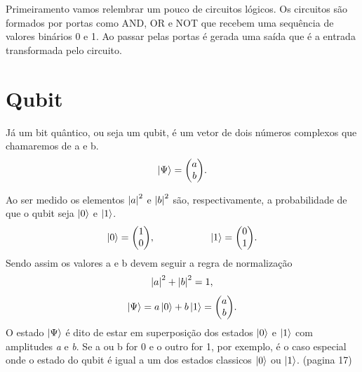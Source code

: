 \documentclass[a4paper, 12pt, oneside]{book}
\begin{document}
Primeiramento vamos relembrar um pouco de circuitos lógicos. Os circuitos são formados por portas como AND, OR e NOT que recebem uma sequência de valores binários 0 e 1. Ao passar pelas portas é gerada uma saída que é a entrada transformada pelo circuito.

\section{Qubit}
Já um bit quântico, ou seja um qubit, é um vetor de dois números complexos que chamaremos de a e b.
\begin{equation} \label{eq1} 
\ket{\Psi} = \mqty(a\\b).
\end{equation}

Ao ser medido os elementos $\abs{a}^2$ e $\abs{b}^2$ são, respectivamente, a probabilidade de que o qubit seja $\ket{0}$ e $\ket{1}$. 
\begin{equation} \label{eq2}
  \ket{0} = \mqty(1\\0) ,\hspace{2cm} 
  \ket{1} = \mqty(0\\1).
\end{equation}
Sendo assim os valores a e b devem seguir a regra de normalização
\begin{equation}\label{eq3}
\abs{a}^2 + \abs{b}^2 = 1,
\end{equation}
\begin{equation}\label{eq4}
\ket{\Psi} = a\ket{0} + b\ket{1} = \mqty(a\\b).
\end{equation}
O estado $\ket{\Psi}$ é dito de estar em superposição dos estados $\ket{0}$ e $\ket{1}$ com amplitudes \textit{a} e \textit{b}. Se a ou b for 0 e o outro for 1, por exemplo, é o caso especial onde o estado do qubit é igual a um dos estados classicos $\ket{0}$ ou $\ket{1}$. (pagina 17)
\end{document}

